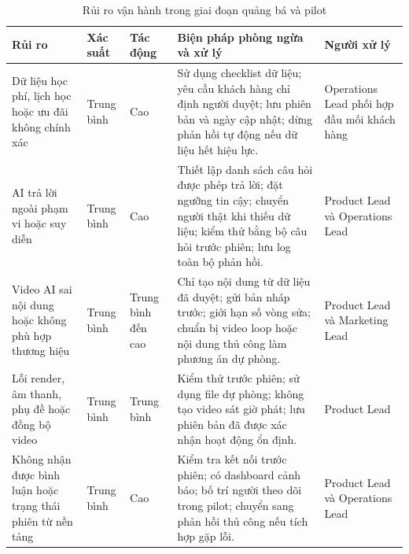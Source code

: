 \begin{table}[H]
    \centering
    \caption{Rủi ro vận hành trong giai đoạn quảng bá và pilot}
    \label{tab:operational-risk-matrix}
    \small
    \renewcommand{\arraystretch}{1.25}
    \begin{tabularx}{\textwidth}{
        p{}
        p{}
        p{}
        X
        p{}
    }
        \hline
        \textbf{Rủi ro}
        & \textbf{Xác suất}
        & \textbf{Tác động}
        & \textbf{Biện pháp phòng ngừa và xử lý}
        & \textbf{Người xử lý} \\
        \hline

        Dữ liệu học phí, lịch học hoặc ưu đãi không chính xác
        &
        Trung bình
        &
        Cao
        &
        Sử dụng checklist dữ liệu; yêu cầu khách hàng chỉ định người duyệt; lưu phiên bản và ngày cập nhật; dừng phản hồi tự động nếu dữ liệu hết hiệu lực.
        &
        Operations Lead phối hợp đầu mối khách hàng \\

        \hline

        AI trả lời ngoài phạm vi hoặc suy diễn
        &
        Trung bình
        &
        Cao
        &
        Thiết lập danh sách câu hỏi được phép trả lời; đặt ngưỡng tin cậy; chuyển người thật khi thiếu dữ liệu; kiểm thử bằng bộ câu hỏi trước phiên; lưu log toàn bộ phản hồi.
        &
        Product Lead và Operations Lead \\

        \hline

        Video AI sai nội dung hoặc không phù hợp thương hiệu
        &
        Trung bình
        &
        Trung bình đến cao
        &
        Chỉ tạo nội dung từ dữ liệu đã duyệt; gửi bản nháp trước; giới hạn số vòng sửa; chuẩn bị video loop hoặc nội dung thủ công làm phương án dự phòng.
        &
        Product Lead và Marketing Lead \\

        \hline

        Lỗi render, âm thanh, phụ đề hoặc đồng bộ video
        &
        Trung bình
        &
        Trung bình
        &
        Kiểm thử trước phiên; sử dụng file dự phòng; không tạo video sát giờ phát; lưu phiên bản đã được xác nhận hoạt động ổn định.
        &
        Product Lead \\

        \hline

        Không nhận được bình luận hoặc trạng thái phiên từ nền tảng
        &
        Trung bình
        &
        Cao
        &
        Kiểm tra kết nối trước phiên; có dashboard cảnh báo; bố trí người theo dõi trong pilot; chuyển sang phản hồi thủ công nếu tích hợp gặp lỗi.
        &
        Product Lead và Operations Lead \\


\end{tabularx}
\end{table}
